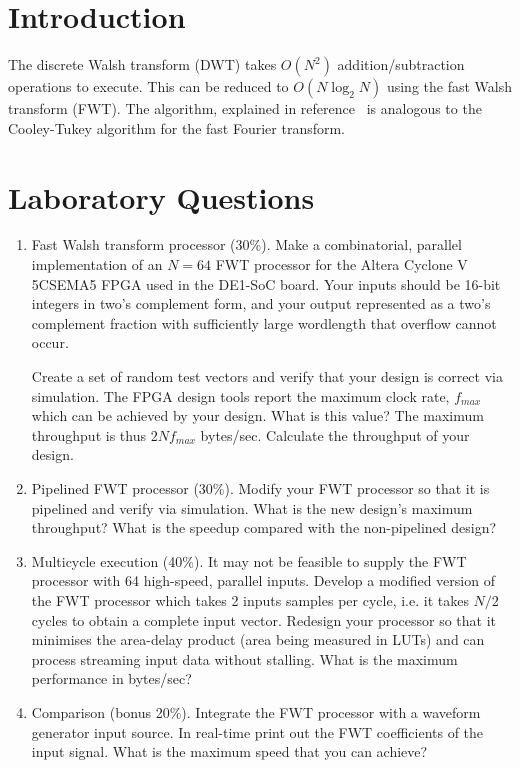 
\section{Introduction}
The discrete Walsh transform (DWT) takes $O(N^2)$ addition/subtraction
operations to execute. This can be reduced to $O(N \log_2 N)$ using
the fast Walsh transform (FWT). The algorithm, explained in
reference~\cite{Shanks:69} is analogous to the Cooley-Tukey algorithm
for the fast Fourier transform.

\section{Laboratory Questions}
\begin{enumerate}
\item Fast Walsh transform processor (30\%). 
Make a combinatorial, parallel implementation of an $N=64$ FWT processor
for the Altera Cyclone V 5CSEMA5 FPGA used in the DE1-SoC board.
Your inputs should be 16-bit integers in two's complement form, and
your output represented as a two's complement fraction with sufficiently
large wordlength that overflow cannot occur. 

Create a set of random test vectors and verify that your design is
correct via simulation. The FPGA design tools report the maximum
clock rate, $f_{max}$ which can be achieved by your design. What is this
value? The 
maximum throughput is thus $2Nf_{max}$ bytes/sec. Calculate the
throughput of your design.

\item Pipelined FWT processor (30\%). 
Modify your FWT processor so that it is pipelined and verify via
simulation. What is the new design's
maximum throughput? What is the speedup compared with the non-pipelined design?

\item Multicycle execution (40\%). 
It may not be feasible to supply the FWT processor with 64 high-speed,
parallel inputs. Develop a modified version of the FWT processor
which takes 2 inputs samples per cycle, i.e. it takes $N/2$ cycles
to obtain a complete input vector. Redesign your processor
so that it minimises the area-delay product (area being measured in
LUTs) and can process streaming input data without stalling.
What is the maximum performance in bytes/sec?

\item Comparison (bonus 20\%). 
Integrate the FWT processor with a waveform generator input source.
In real-time print out the FWT coefficients of the input signal.
What is the maximum speed that you can achieve?

\end{enumerate}

